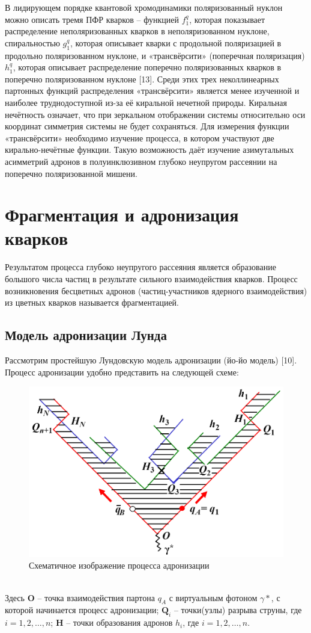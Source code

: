 \documentclass{extarticle}
\begin{document}
 В лидирующем порядке квантовой хромодинамики поляризованный нуклон можно описать тремя ПФР кварков – функцией $f_1^q$, которая показывает распределение неполяризованных кварков в неполяризованном нуклоне, спиральностью $g_1^q$, которая описывает кварки с продольной поляризацией в продольно поляризованном нуклоне, и «трансвёрсити» (поперечная поляризация) $h_1^q$, которая описывает распределение поперечно поляризованных кварков в поперечно поляризованном нуклоне [13]. Среди этих трех неколлинеарных партонных функций распределения «трансвёрсити» является менее изученной и наиболее труднодоступной из-за её киральной нечетной природы. Киральная нечётность означает, что при зеркальном отображении системы относительно оси координат симметрия системы не будет сохраняться.
Для измерения функции «трансвёрсити» необходимо изучение процесса, в котором участвуют две кирально-нечётные функции. Такую возможность даёт изучение азимутальных асимметрий адронов в полуинклюзивном глубоко неупругом рассеянии на поперечно поляризованной мишени.

\newpage

\section{Фрагментация и адронизация кварков}
Результатом процесса глубоко неупругого рассеяния является образование большого числа частиц в результате сильного взаимодействия кварков. Процесс возникновения бесцветных адронов (частиц-участников ядерного взаимодействия) из цветных кварков называется фрагментацией.
\subsection{Модель адронизации Лунда}
Рассмотрим простейшую Лундовскую модель адронизации (йо-йо модель) [10]. Процесс адронизации удобно представить на следующей схеме: 
\begin{figure}[h]
    \centering
    \includegraphics[width = 0.7\linewidth]{fragmentation.png}
    \caption{Схематичное изображение процесса адронизации}
    \label{fig:hadronization}
\end{figure} 
\\
Здесь \textbf{O} – точка взаимодействия партона $q_A$ с виртуальным фотоном $\gamma*$, с которой начинается процесс адронизации; $\textbf{Q}_i$ – точки(узлы) разрыва струны, где $i = 1, 2, \dots, n$; \textbf{H} -- точки образования адронов $h_i$, где $i = 1, 2, \dots, n$.
\end{document}

